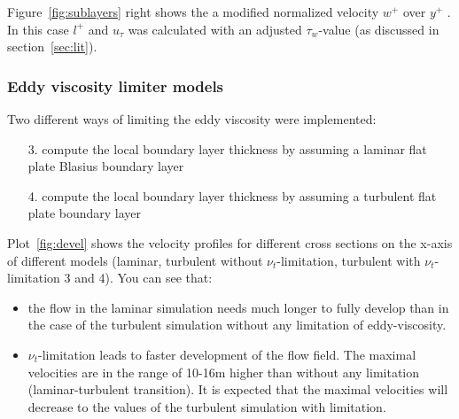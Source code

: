 \documentclass[11pt,a4paper]{article}
\begin{document}
\noindent Figure~\ref{fig:sublayers} right shows the a modified normalized velocity $w^+$ over $y^+$ . In this case $l^+$ and $u_{\tau}$ was calculated with an adjusted $\tau_w$-value (as discussed in section~\ref{sec:lit}).

\subsubsection{Eddy viscosity limiter models}

Two different ways of limiting the eddy viscosity were implemented:
\begin{itemize}
\item[3.] compute the local boundary layer thickness by assuming a laminar flat plate Blasius boundary layer
\item[4.] compute the local boundary layer thickness by assuming a turbulent flat plate boundary layer
\end{itemize}

\noindent Plot~\ref{fig:devel} shows the velocity profiles for different cross sections on the x-axis of different models (laminar, turbulent without $\nu_t$-limitation, turbulent with $\nu_t$-limitation 3 and 4). You can see that:
\begin{itemize}
\item the flow in the laminar simulation needs much longer to fully develop than in the case of the turbulent simulation without any limitation of eddy-viscosity.
\item $\nu_t$-limitation leads to faster development of the flow field. The maximal velocities are in the range of 10-16m higher than without any limitation (laminar-turbulent transition). It is expected that the maximal velocities will decrease to the values of the turbulent simulation with limitation.
\end{itemize}

\clearpage


%    

\clearpage

\newcommand{\eqvd}{\stackrel{\mathrm{2D}}{=}}
\newcommand{\eqvdd}{\stackrel{\mathrm{3D}}{=}}
\end{document}
